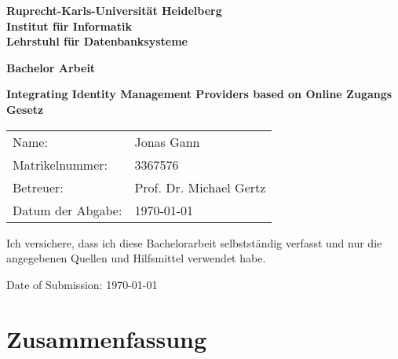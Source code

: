 \documentclass[
     12pt,         %
     a4paper,      %
     BCOR=10mm,version=first,     %
     DIV=14,version=first,        %
     ]{scrreprt}
\begin{document}
\begin{titlepage}
     \vspace*{1cm}
     \begin{center}
          \vspace*{3cm}
          \textbf
          {
               \Large Ruprecht-Karls-Universität Heidelberg\\
               \smallskip
               \Large Institut für Informatik\\
               \smallskip
               \Large Lehrstuhl für Datenbanksysteme\\
               \smallskip
          }

          \vspace{3cm}

          \textbf{\large Bachelor Arbeit}

          \vspace{0.5\baselineskip}
          {
               \huge
               \textbf{Integrating Identity Management Providers based on Online Zugangs Gesetz}
          }

     \end{center}

     \vfill
     {
          \large
          \begin{tabular}[l]{ll}
               Name:                 & Jonas Gann              \\
               Matrikelnummer: & 3367576                 \\
               Betreuer:           & Prof. Dr. Michael Gertz \\
               Datum der Abgabe:   & \today
          \end{tabular}
     }

\end{titlepage}

\onehalfspacing

\thispagestyle{empty}

\vspace*{100pt}
\noindent
Ich versichere, dass ich diese Bachelorarbeit selbstständig verfasst und nur die angegebenen Quellen und Hilfsmittel verwendet habe.

\vspace*{50pt}
\noindent

\underline{\phantom{mmmmmmmmmmmmmmmmmmmm}}

\medskip
\noindent
Date of Submission: \today
\newpage

\chapter*{Zusammenfassung}
\end{document}
